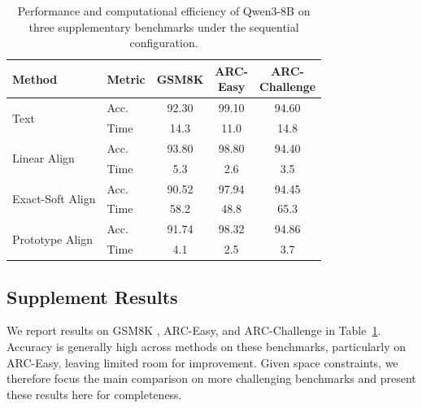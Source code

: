 \documentclass[11pt]{article}
\begin{document}
\begin{table}[t]
\centering
\setlength{\tabcolsep}{3pt}
\renewcommand{\arraystretch}{1.1}
\small
\begin{tabular}{@{}llccc@{}}
\toprule
Method & Metric & GSM8K
& \makecell{ARC-\\Easy}
& \makecell{ARC-\\Challenge} \\
\midrule
\multirow{2}{*}{Text}
& Acc.  & 92.30 & 99.10 & 94.60 \\
& Time  & 14.3  & 11.0  & 14.8  \\
\midrule
\multirow{2}{*}{Linear Align}
& Acc.  & 93.80 & 98.80 & 94.40 \\
& Time  & 5.3   & 2.6   & 3.5   \\
\midrule
\multirow{2}{*}{Exact-Soft Align}
& Acc.  & 90.52 & 97.94 & 94.45 \\
& Time  & 58.2  & 48.8  & 65.3  \\
\midrule
\multirow{2}{*}{Prototype Align}
& Acc.  & 91.74 & 98.32 & 94.86 \\
& Time  & 4.1   & 2.5   & 3.7   \\
\bottomrule
\end{tabular}
\caption{Performance and computational efficiency of Qwen3-8B
on three supplementary benchmarks under the sequential configuration.}
\label{tab:supplement_8b_results}
\end{table}


\subsection{Supplement Results}
\label{app:supplement}
We report results on GSM8K \citep{gsm8k}, ARC-Easy, and ARC-Challenge \citep{arc} in Table~\ref{tab:supplement_8b_results}. Accuracy is generally high across methods on these benchmarks, particularly on ARC-Easy, leaving limited room for improvement. Given space constraints, we therefore focus the main comparison on more challenging benchmarks and present these results here for completeness. 

\end{document}
